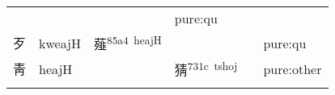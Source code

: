\documentclass[14pt,a4paper]{scrartcl}
\begin{document}
\begin{longtable}[c]{@{}llllll@{}}
\begin{minipage}[t]{0.14\columnwidth}
\strut\end{minipage} &
\begin{minipage}[t]{0.14\columnwidth}\raggedright\strut
\strut\end{minipage} &
\begin{minipage}[t]{0.14\columnwidth}\raggedright\strut
\strut\end{minipage} &
\begin{minipage}[t]{0.14\columnwidth}\raggedright\strut
pure:qu
\strut\end{minipage}\tabularnewline
\begin{minipage}[t]{0.14\columnwidth}\raggedright\strut
歹
\strut\end{minipage} &
\begin{minipage}[t]{0.14\columnwidth}\raggedright\strut
kweajH
\strut\end{minipage} &
\begin{minipage}[t]{0.14\columnwidth}\raggedright\strut
薤\textsuperscript{85a4~heajH}
\strut\end{minipage} &
\begin{minipage}[t]{0.14\columnwidth}\raggedright\strut
\strut\end{minipage} &
\begin{minipage}[t]{0.14\columnwidth}\raggedright\strut
\strut\end{minipage} &
\begin{minipage}[t]{0.14\columnwidth}\raggedright\strut
pure:qu
\strut\end{minipage}\tabularnewline
\begin{minipage}[t]{0.14\columnwidth}\raggedright\strut
靑
\strut\end{minipage} &
\begin{minipage}[t]{0.14\columnwidth}\raggedright\strut
heajH
\strut\end{minipage} &
\begin{minipage}[t]{0.14\columnwidth}\raggedright\strut
\strut\end{minipage} &
\begin{minipage}[t]{0.14\columnwidth}\raggedright\strut
猜\textsuperscript{731c~tshoj}
\strut\end{minipage} &
\begin{minipage}[t]{0.14\columnwidth}\raggedright\strut
\strut\end{minipage} &
\begin{minipage}[t]{0.14\columnwidth}\raggedright\strut
pure:other
\strut\end{minipage}\tabularnewline
\begin{minipage}[t]{0.14\columnwidth}\raggedright\strut

\end{minipage}
\end{longtable}
\end{document}
